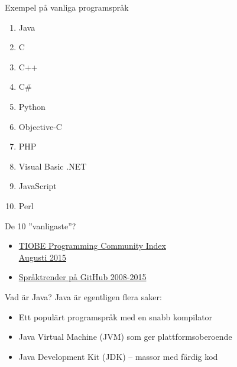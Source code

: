 \documentclass{lecturenotes}
\begin{document}
\begin{SlideSimple}{Exempel på vanliga programspråk}
\begin{multicols}{2}
\begin{enumerate}
\item  Java
\item C
\item C++
\item C\#
\item Python
\item Objective-C
\item PHP
\item Visual Basic .NET
\item JavaScript
\item Perl
\end{enumerate}

\columnbreak %
De 10 ''vanligaste''?
\begin{itemize}
\item \href{http://www.tiobe.com/index.php/content/paperinfo/tpci/index.html}{TIOBE Programming Community Index \\ Augusti 2015}
\item \href{https://github.com/blog/2047-language-trends-on-github}{Språktrender på GitHub 2008-2015}
\end{itemize}
\end{multicols}
\end{SlideSimple}

\begin{Slide}{Vad är Java?}
Java är egentligen flera saker:
\begin{itemize}
\item Ett populärt programspråk med en snabb kompilator
\item Java Virtual Machine (JVM) som ger plattformsoberoende
\item Java Development Kit (JDK) -- massor med färdig kod 
\end{itemize}
\end{Slide}

\end{document}
